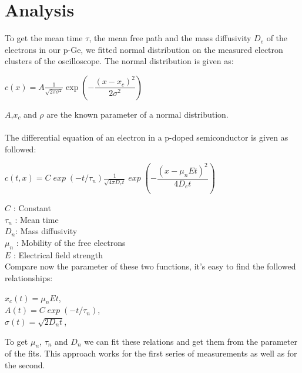 \section{Analysis}
To get the mean time $\mathit{\tau}$, the mean free path and the mass diffusivity $\mathit{D_{e}}$ of the electrons in our p-Ge, we fitted normal distribution on the measured electron clusters of the oscilloscope. The normal distribution is given as:\\
\begin{center}
$\mathit{c(x)=A\frac{1}{\sqrt{2\pi \sigma^2}}}\exp\left(-\dfrac{(x-x_{c})^2}{2\sigma^2}\right)$
\end{center}
$\mathit{A}$,$\mathit{x_{c}}$ and $\mathit{\rho}$ are the known parameter of a normal distribution.\\
\\
The differential equation of an electron in a p-doped semiconductor is given as followed:\\
\begin{center}
$\mathit{c(t,x)=C\exp(-t/\tau_{n})\frac{1}{\sqrt{4\pi D_{e}t}} \exp\left(-\dfrac{(x-\mu_{n}Et)^2}{4D_{e}t}\right)}$
\end{center}
$\mathit{C}$ : Constant\\
$\mathit{\tau_{n}}$ : Mean time\\
$\mathit{D_{n}}$: Mass diffusivity\\
$\mathit{\mu_{n}}$ : Mobility of the free electrons\\
$\mathit{E}$ : Electrical field strength\\

Compare now the parameter of these two functions, it's easy to find the followed relationships:
\begin{tabbing}
$\mathit{x_{c}(t)=\mu_{n}Et}$,\\
$\mathit{A(t)=C \exp(-t/\tau_{n})}$,\\
$\mathit{\sigma(t)=\sqrt{2D_{n}t}}$,\\
\end{tabbing}
To get $\mathit{\mu_{n}}$, $\mathit{\tau_{n}}$ and $\mathit{D_{n}}$ we can fit these relations and get them from the parameter of the fits.
This approach works for the first series of measurements as well as for the second. 
\newpage
